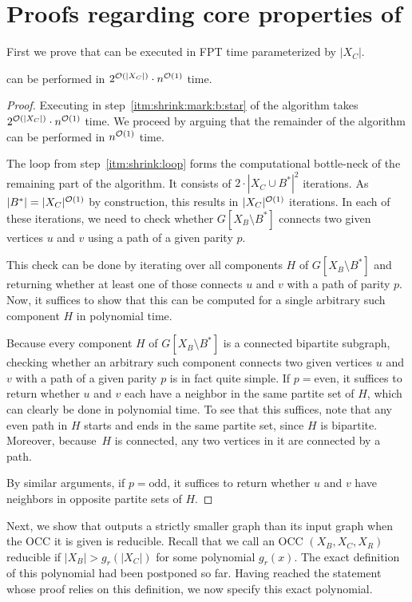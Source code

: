 \section{Proofs regarding core properties of } \label{sec:reduction:proofs}
First we prove that  can be executed in FPT time parameterized by $|X_C|$.
\begin{lemma} \label{lem:shrink:running:time}
	\Refreduction can be performed in $2^{\mathcal{O}(|X_C|)} \cdot n^{\mathcal{O}(1)}$ time.
\end{lemma}
\begin{proof}
	Executing  in step~\ref{itm:shrink:mark:b:star} of the algorithm takes $2^{\mathcal{O}(|X_C|)} \cdot n^{\mathcal{O}(1)}$ time. We proceed by arguing that the remainder of the algorithm can be performed in $n^{\mathcal{O}(1)}$ time.
	
	The loop from step~\ref{itm:shrink:loop} forms the computational bottle-neck of the remaining part of the algorithm. It consists of $2 \cdot |X_C \cup B^\ast|^2$ iterations. As $|B^\ast| = |X_C|^{\mathcal{O}(1)}$ by construction, this results in $|X_C|^{\mathcal{O}(1)}$ iterations. In each of these iterations, we need to check whether $G[X_B \setminus B^\ast]$ connects two given vertices $u$ and $v$ using a path of a given parity $p$. 
	
	This check can be done by iterating over all components $H$ of $G[X_B \setminus B^\ast]$ and returning whether at least one of those connects $u$ and $v$ with a path of parity $p$. Now, it suffices to show that this can be computed for a single arbitrary such component $H$ in polynomial time.
	
	Because every component $H$ of $G[X_B \setminus B^\ast]$ is a connected bipartite subgraph, checking whether an arbitrary such component connects two given vertices $u$ and $v$ with a path of a given parity $p$ is in fact quite simple. If $p = \text{even}$, it suffices to return whether $u$ and $v$ each have a neighbor in the same partite set of $H$, which can clearly be done in polynomial time. To see that this suffices, note that any even path in $H$ starts and ends in the same partite set, since $H$ is bipartite. Moreover, because~$H$ is connected, any two vertices in it are connected by a path.
	
	By similar arguments, if $p = \text{odd}$, it suffices to return whether $u$ and $v$ have neighbors in opposite partite sets of $H$.
\end{proof}
%
Next, we show that  outputs a strictly smaller graph than its input graph when the OCC it is given is reducible. Recall that we call an OCC $(X_B, X_C, X_R)$ reducible if $|X_B| > g_r(|X_C|)$ for some polynomial $g_r(x)$. The exact definition of this polynomial had been postponed so far. Having reached the statement whose proof relies on this definition, we now specify this exact polynomial.

